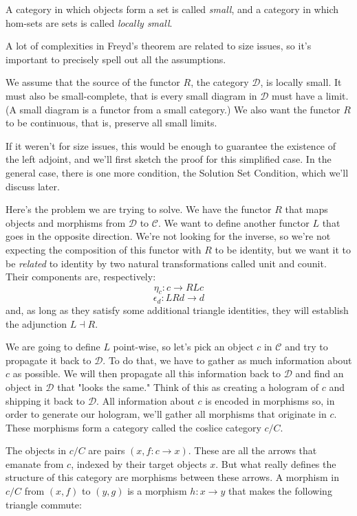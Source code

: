 \documentclass[11pt]{amsart}
\newcommand{\cat}[1]{\mathcal{#1}}
\begin{document}
A category in which objects form a set is called \emph{small}, and a category in which hom-sets are sets is called \emph{locally small}. 

A lot of complexities in Freyd's theorem are related to size issues, so it's important to precisely spell out all the assumptions.

We assume that the source of the functor $R$, the category $\cat D$, is locally small. It must also be small-complete, that is every small diagram in $\cat D$ must have a limit. (A small diagram is a functor from a small category.) We also want the functor $R$ to be continuous, that is, preserve all small limits. 

If it weren't for size issues, this would be enough to guarantee the existence of the left adjoint, and we'll first sketch the proof for this simplified case. In the general case, there is one more condition, the Solution Set Condition, which we'll discuss later.

Here's the problem we are trying to solve. We have the functor $R$ that maps objects and morphisms from $\cat D$ to $\cat C$. We want to define another functor $L$ that goes in the opposite direction. We're not looking for the inverse, so we're not expecting the composition of this functor with $R$ to be identity, but we want it to be \emph{related} to identity by two natural transformations called unit and counit. Their components are, respectively:
\[ \eta_c : c \to R L c\]
\[\epsilon_d : L R d \to d \]
and, as long as they satisfy some additional triangle identities, they will establish the adjunction $L \dashv R$.

We are going to define $L$ point-wise, so let's pick an object $c$ in $\cat C$ and try to propagate it back to $\cat D$. To do that, we have to gather as much information about $c$ as possible. We will then propagate all this information back to $\cat D$ and find an object in $\cat D$ that "looks the same." Think of this as creating a hologram of $c$ and shipping it back to $\cat D$. All information about $c$ is encoded in morphisms so, in order to generate our hologram, we'll gather all morphisms that originate in $c$. These morphisms form a category called the coslice category $c/C$. 

The objects in $c/C$ are pairs $(x, f \colon c \to x)$. These are all the arrows that emanate from $c$, indexed by their target objects $x$. But what really defines the structure of this category are morphisms between these arrows. A morphism in $c/C$ from $(x, f)$ to $(y, g)$ is a morphism $h \colon x \to y$ that makes the following triangle commute:
\end{document}
